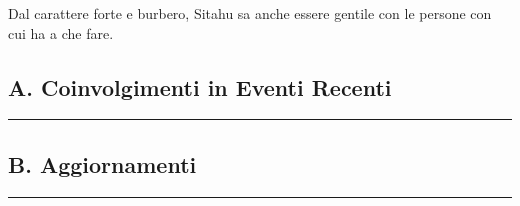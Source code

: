 Dal carattere forte e burbero, Sitahu sa anche essere gentile con le
persone con cui ha a che fare.

\subsection{A. Coinvolgimenti in Eventi
Recenti}\label{a.-coinvolgimenti-in-eventi-recenti}

\begin{center}\rule{0.5\linewidth}{0.5pt}\end{center}

\href{Untitled\%20a5c073df748d49faafdcd1483cca11a6.csv}{}

\subsection{B. Aggiornamenti}\label{b.-aggiornamenti}

\begin{center}\rule{0.5\linewidth}{0.5pt}\end{center}

\href{Untitled\%2079407ebfb30d4c9f9d5a567ab6f7be61.csv}{}
